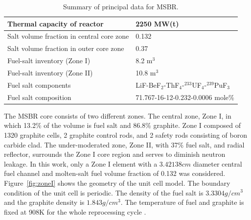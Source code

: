 \documentclass{anstrans}
\begin{document}
\captionsetup[table]{
        labelsep = newline,
        name = TABLE, justification=justified,
        singlelinecheck=false,%
        labelsep=colon,%
skip = \medskipamount}
\begin{table}[h!]
        \begin{tabularx}{\linewidth}{l X} \toprule 
                Thermal capacity of reactor           & 2250 MW(t)
                \\ \midrule
                Salt volume fraction in central core zone     & 0.132
                \\ \midrule
                Salt volume fraction in outer core zone       & 0.37
                \\ \midrule
                Fuel-salt inventory (Zone I)                  & 8.2 m$^3$	
                \\ \midrule
                Fuel-salt inventory (Zone II)                 & 10.8 m$^3$	
                \\ \midrule
                Fuel salt components                  & 
                LiF-BeF$_2$-ThF$_4$-$^{233}$UF$_4$-$^{239}$PuF$_3$	\\ 
                \midrule
                Fuel salt composition                 & 
                71.767-16-12-0.232-0.0006 mole\%
                \\
                \bottomrule
        \end{tabularx}
        \caption{Summary of principal data for MSBR.}
        \label{tab:data}
\end{table}

The \gls{MSBR} core consists of two different zones. The central 
zone, Zone I, in which 13.2\% of the volume is fuel salt and 86.8\% graphite. 
Zone I composed of 1320 graphite cells, 2 graphite control rods, and 
2 safety rods consisting of boron carbide clad. The under-moderated zone, Zone 
II, with 37\% fuel salt, and radial reflector, surrounds the Zone I core region 
and serves to diminish neutron leakage. In this work, 
only a Zone I element with a $3.42138 cm$ diameter central fuel channel and molten-salt 
fuel volume fraction of 0.132 was considered. Figure~\ref{fig:zoneI} shows the 
geometry of the unit cell model. The boundary condition of the unit cell is 
periodic. The density of the fuel salt is $3.3304 g/cm^3$ and the graphite density is 
$1.843 g/cm^3$. The temperature of fuel and graphite is fixed at 908K for the whole 
reprocessing cycle \cite{robertson_conceptual_1971}.
\end{document}
